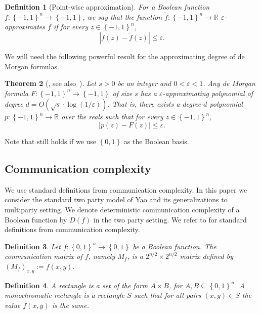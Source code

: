 \documentclass[10pt,a4paper]{article}
\newtheorem{theorem}{Theorem}
\newtheorem{definition}[theorem]{Definition}
\let\citep\cite
\newcommand{\bool}{\left\{0,1\right\}}
\newcommand{\boolpm}{\left\{-1,1\right\}}
\newcommand{\real}{\mathbb{R}}
\newcommand{\prn}[1]{\left(#1\right)}
\begin{document}
    \begin{definition}[Point-wise approximation]
        For a Boolean function $f\colon\boolpm^n\to\boolpm$, we say that the function $\tilde{f}\colon\boolpm^n\to\real$ $\varepsilon$-approximates $f$ if for every $z\in\boolpm^n$,
		\[
			\left| f(z)-\tilde{f}(z)\right| \leq \varepsilon.
		\]
    \end{definition}
    
    We will need the following powerful result for the approximating degree of de Morgan formulas.
    
    \begin{theorem}[\cite{Rei11b}, see also~\cite{ BNRdW07}]\label{thm:approx-polynomial}
		Let $s>0$ be an integer and $0<\varepsilon<1$. Any de Morgan formula $F\colon\boolpm^n\to\boolpm$ of size $s$ has a $\varepsilon$-approximating polynomial of degree $d=O(\sqrt{s}\cdot\log(1/\varepsilon))$. That is, there exists a degree-$d$ polynomial $p\colon\boolpm^n\to\real$ over the reals such that for every $z\in\boolpm^n$,
		\[
			\left| p(z)-F(z)\right| \leq \varepsilon.
		\]
	\end{theorem}
	
	Note that  still holds if we use $\bool$ as the Boolean basis.
    
	\subsection{Communication complexity}
	
	We use standard definitions from communication complexity. In this paper we consider the standard two party model of Yao and its generalizations to multiparty setting. We denote deterministic communication complexity of a Boolean function by $D(f)$ in the two party setting. We refer to \citep{Kushilevitz-Nisan97} for 
	standard definitions from communication complexity.
	
%
%
	    
%
%
	
%
	
	\begin{definition}
	    Let $f\colon\bool^{n}\to\bool$ be a Boolean function. The \emph{communication matrix of $f$}, namely $M_f$, is a $2^{n/2}\times2^{n/2}$ matrix defined by $\prn{M_f}_{x,y}:=f(x,y)$.
	\end{definition}
	
	\begin{definition}
	    A \emph{rectangle} is a set of the form $A\times B$, for $A,B\subseteq\bool^n$. A \emph{monochromatic rectangle} is a rectangle $S$ such that for all pairs $(x,y)\in S$ the value $f(x,y)$ is the same.
    \end{definition}
	
\end{document}
